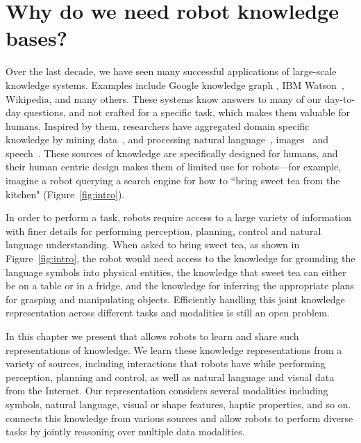 \section{Why do we need robot knowledge bases?}
Over the last decade, we have seen many successful applications of large-scale knowledge systems.
Examples include  Google knowledge graph \cite{dong2014knowledge}, IBM Watson~\cite{ferrucci2010}, Wikipedia,
 and many others.
These systems know answers to many of our day-to-day questions, and
 not crafted for a specific task, which makes them valuable for humans.
Inspired by them, researchers have aggregated domain specific knowledge by mining
data~\cite{dbpedia2007, freebase2008}, and processing natural
language~\cite{nell2010}, images~\cite{imagenet2009} and
speech~\citep{mohamed2011deep}.  These sources of knowledge are specifically designed for humans, and their  human centric design makes them of limited use for robots---for example, imagine a robot querying a search engine
 for how to ``bring sweet tea from the kitchen" (Figure~\ref{fig:intro}).


 In order to perform a task, robots require access to a large variety of information with finer details for performing
 perception, planning, control and natural language understanding. When asked to bring sweet tea, as shown in Figure~\ref{fig:intro}, the robot
 would need access to the knowledge for grounding the language symbols into physical entities,
  the knowledge that sweet tea can either be on a table or in a fridge, and the knowledge for inferring the
 appropriate plans for grasping and manipulating objects. Efficiently handling this joint knowledge representation across different
 tasks and modalities is still an open problem.

In this chapter we present \robobrain{} that allows robots to learn and share such representations of knowledge.
We learn these knowledge representations from a variety of sources, including interactions that robots have while performing perception,
planning and control, as well as natural language and visual data from the Internet.
Our representation considers several modalities including symbols, natural language, visual or shape features, haptic properties, and so on. \robobrain{} connects this knowledge from various sources and allow robots to perform diverse tasks by jointly reasoning over multiple data modalities.  %


